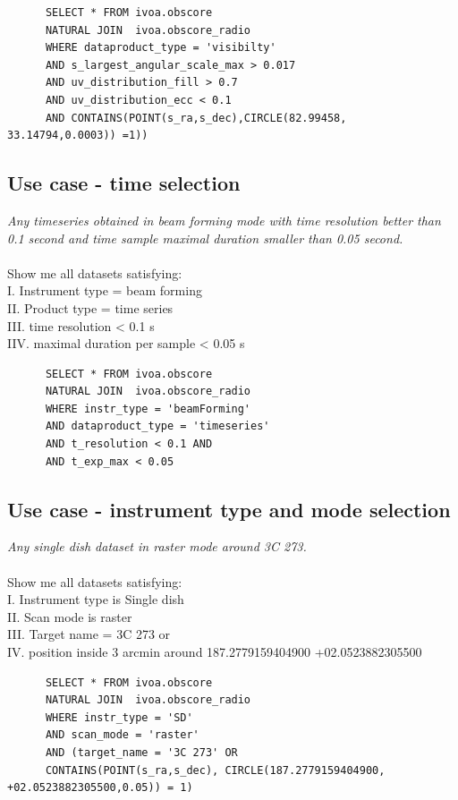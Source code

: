 \begin{verbatim}
      SELECT * FROM ivoa.obscore 
      NATURAL JOIN  ivoa.obscore_radio
      WHERE dataproduct_type = 'visibilty' 
      AND s_largest_angular_scale_max > 0.017
      AND uv_distribution_fill > 0.7 
      AND uv_distribution_ecc < 0.1  
      AND CONTAINS(POINT(s_ra,s_dec),CIRCLE(82.99458, 33.14794,0.0003)) =1))
\end{verbatim}

\subsection{Use case -  time selection }
\textit{Any timeseries obtained in beam forming mode with time resolution better than 0.1 second and time sample maximal duration smaller than 0.05 second. }\\ \\
Show me all datasets satisfying:\\
I. Instrument type = beam forming\\
II. Product type = time series  \\
III. time resolution < 0.1 s\\
IIV. maximal duration per sample  < 0.05 s 

\begin{verbatim}
      SELECT * FROM ivoa.obscore 
      NATURAL JOIN  ivoa.obscore_radio
      WHERE instr_type = 'beamForming' 
      AND dataproduct_type = 'timeseries' 
      AND t_resolution < 0.1 AND
      AND t_exp_max < 0.05 
\end{verbatim}

\subsection{Use case -  instrument type and mode selection }
\label{sec:instrument-mode}
\textit{Any single dish  dataset  in raster mode around 3C 273.}\\ \\
Show me all datasets satisfying:\\
I. Instrument type is Single dish \\
II. Scan mode is raster \\
III. Target name = 3C 273 or \\
IV. position inside 3 arcmin around 187.2779159404900 +02.0523882305500

\begin{verbatim}
      SELECT * FROM ivoa.obscore 
      NATURAL JOIN  ivoa.obscore_radio
      WHERE instr_type = 'SD' 
      AND scan_mode = 'raster' 
      AND (target_name = '3C 273' OR
      CONTAINS(POINT(s_ra,s_dec), CIRCLE(187.2779159404900, +02.0523882305500,0.05)) = 1)     
\end{verbatim}


